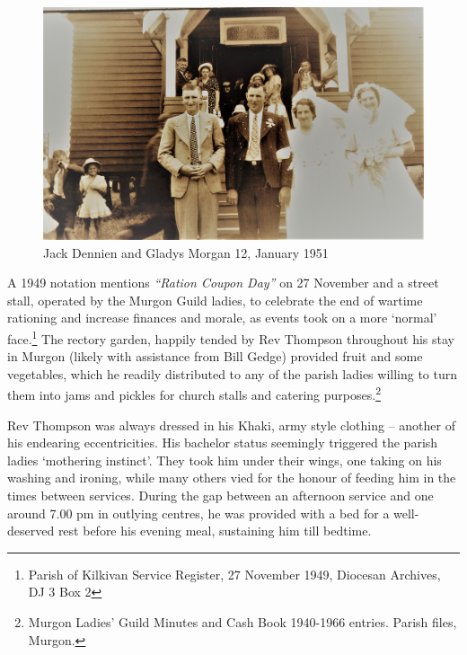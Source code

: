 \begin{figure}[!htb]
\begin{center}
\includegraphics[width=1.\textwidth,center]{../images/JackDennienGladysMorgan12Jan1951.jpg}
\caption{Jack Dennien and Gladys Morgan 12, January 1951}
\end{center}
\end{figure}




A 1949 notation mentions \emph{``Ration Coupon Day''} on 27 November and a street stall, operated by the Murgon Guild ladies, to celebrate the end of wartime rationing and increase finances and morale, as events took on a more `normal' face.\footnote{Parish of Kilkivan Service Register, 27 November 1949, Diocesan Archives, DJ 3 Box 2} The rectory garden, happily tended by Rev Thompson throughout his stay in Murgon (likely with assistance from Bill Gedge) provided fruit and some vegetables, which he readily distributed to any of the parish ladies willing to turn them into jams and pickles for church stalls and catering purposes.\footnote{Murgon Ladies' Guild Minutes and Cash Book 1940-1966 entries. Parish files, Murgon.}


Rev Thompson was always dressed in his Khaki, army style clothing -- another of his endearing eccentricities. His bachelor status seemingly triggered the parish ladies `mothering instinct'. They took him under their wings, one taking on his washing and ironing, while many others vied for the honour of feeding him in the times between services. During the gap between an afternoon service and one around 7.00 pm in outlying centres, he was provided with a bed for a well-deserved rest before his evening meal, sustaining him till bedtime.



